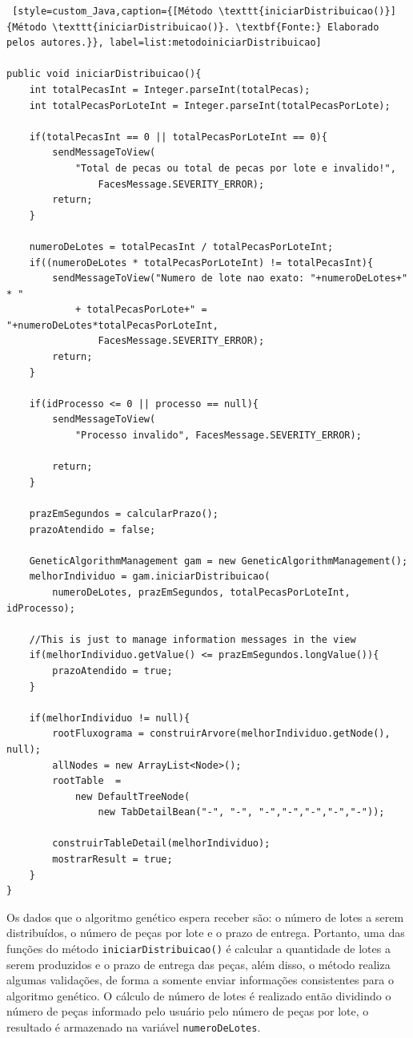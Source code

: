 \begin{lstlisting} [style=custom_Java,caption={[Método \texttt{iniciarDistribuicao()}]{Método \texttt{iniciarDistribuicao()}. \textbf{Fonte:} Elaborado pelos autores.}}, label=list:metodoiniciarDistribuicao] 

public void iniciarDistribuicao(){
	int totalPecasInt = Integer.parseInt(totalPecas);
	int totalPecasPorLoteInt = Integer.parseInt(totalPecasPorLote);
	
	if(totalPecasInt == 0 || totalPecasPorLoteInt == 0){
		sendMessageToView(
			"Total de pecas ou total de pecas por lote e invalido!", 
				FacesMessage.SEVERITY_ERROR);
		return;
	}
	
	numeroDeLotes = totalPecasInt / totalPecasPorLoteInt;
	if((numeroDeLotes * totalPecasPorLoteInt) != totalPecasInt){
		sendMessageToView("Numero de lote nao exato: "+numeroDeLotes+" * "
			+ totalPecasPorLote+" = "+numeroDeLotes*totalPecasPorLoteInt, 
				FacesMessage.SEVERITY_ERROR);
		return;
	}
	
	if(idProcesso <= 0 || processo == null){
		sendMessageToView(
			"Processo invalido", FacesMessage.SEVERITY_ERROR);
		
		return;
	}
	
	prazEmSegundos = calcularPrazo();
	prazoAtendido = false;
	
	GeneticAlgorithmManagement gam = new GeneticAlgorithmManagement();
	melhorIndividuo = gam.iniciarDistribuicao(
		numeroDeLotes, prazEmSegundos, totalPecasPorLoteInt, idProcesso);
	
	//This is just to manage information messages in the view
	if(melhorIndividuo.getValue() <= prazEmSegundos.longValue()){
		prazoAtendido = true;
	}
	
	if(melhorIndividuo != null){
		rootFluxograma = construirArvore(melhorIndividuo.getNode(), null);
		allNodes = new ArrayList<Node>();
		rootTable  = 
			new DefaultTreeNode(
				new TabDetailBean("-", "-", "-","-","-","-","-"));
	
		construirTableDetail(melhorIndividuo);
		mostrarResult = true;
	}
}

\end{lstlisting}

\par Os dados que o algoritmo genético espera receber são: o número de lotes a
serem distribuídos, o número de peças por lote e o prazo de entrega. Portanto, uma das funções do método \texttt{iniciarDistribuicao()} é
calcular a quantidade de lotes a serem produzidos e o prazo de entrega das peças, além disso, o método 
realiza algumas validações, de forma a somente enviar informações consistentes para o algoritmo genético. 
O cálculo de número de lotes é realizado então dividindo o número de peças informado pelo usuário pelo 
número de peças por lote, o resultado é armazenado na variável \texttt{numeroDeLotes}.

